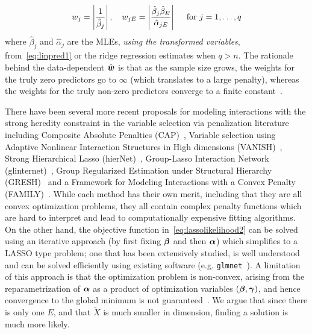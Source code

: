 \begin{equation}
w_j = \left | \frac{1}{\hat{\beta}_j} \right|, \quad w_{jE} = \left | \frac{\hat{\beta}_j \hat{\beta}_E}{\hat{\alpha}_{jE}} \right| \quad \textrm{{ for }}j=1, \ldots, q   \label{eq:weights}
\end{equation}
where $\hat{\beta}_j$ and $\hat{\alpha}_{j}$ are the MLEs, \textit{using the transformed variables}, from~\eqref{eq:linpred1} or the ridge regression estimates when $q > n$. The rationale behind the data-dependent $\hat{\boldsymbol{w}}$ is that as the sample size grows, the weights for the truly zero predictors go to $\infty$ (which translates to a large penalty), whereas the weights for the truly non-zero predictors converge to a finite constant~\citep{zou2006adaptive}. 

There have been several more recent proposals for modeling interactions with the strong heredity constraint in the variable selection via penalization literature including Composite Absolute Penalties (CAP)~\citep{zhao2009composite}, Variable selection using Adaptive Nonlinear Interaction Structures in High dimensions (VANISH)~\citep{radchenko2010variable}, Strong Hierarchical Lasso (hierNet)~\citep{bien2013lasso}, Group-Lasso Interaction Network (glinternet)~\citep{lim2015learning}, Group Regularized Estimation under Structural Hierarchy (GRESH)~\citep{she2014group} and a Framework for Modeling Interactions with a Convex Penalty (FAMILY)~\citep{haris2014convex}. While each method has their own merit, including that they are all convex optimization problems, they all contain complex penalty functions which are hard to interpret and lead to computationally expensive fitting algorithms. On the other hand, the objective function in~\eqref{eq:lassolikelihood2} can be solved using an iterative approach (by first fixing $\boldsymbol{\beta}$ and then $\boldsymbol{\alpha}$) which simplifies to a LASSO type problem; one that has been extensively studied, is well understood and can be solved efficiently using existing software (e.g. \texttt{glmnet}~\citep{friedman2010regularization}). A limitation of this approach is that the optimization problem is non-convex, arising from the reparametrization of $\boldsymbol{\alpha}$ as a product of optimization variables $(\boldsymbol{\beta}, \boldsymbol{\gamma})$, and hence convergence to the global minimum is not guaranteed~\citep{choi2010variable}. We argue that since there is only one $E$, and that $\widetilde{X}$ is much smaller in dimension, finding a solution is much more likely. 



